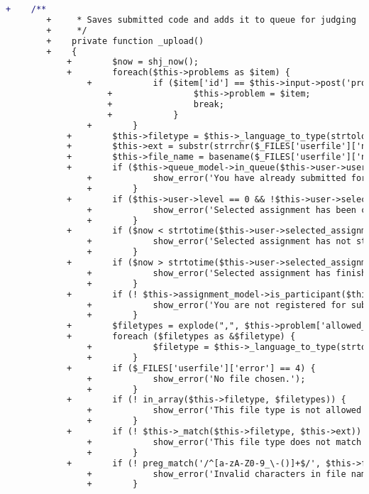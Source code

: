\begin{lstlisting}[language=diff, caption=Perubahan pada kode Submit.php]
		+    /**
		+     * Saves submitted code and adds it to queue for judging
		+     */
		+    private function _upload()
		+    {
			+        $now = shj_now();
			+        foreach($this->problems as $item) {
				+            if ($item['id'] == $this->input->post('problem')) {
					+                $this->problem = $item;
					+                break;
					+            }
				+        }
			+        $this->filetype = $this->_language_to_type(strtolower(trim($this->input->post('language'))));
			+        $this->ext = substr(strrchr($_FILES['userfile']['name'], '.'), 1); // uploaded file extension
			+        $this->file_name = basename($_FILES['userfile']['name'], ".{$this->ext}"); // uploaded file name without extension
			+        if ($this->queue_model->in_queue($this->user->username, $this->user->selected_assignment['id'], $this->problem['id'])) {
				+            show_error('You have already submitted for this problem. Your last submission is still in queue.');
				+        }
			+        if ($this->user->level == 0 && !$this->user->selected_assignment['open']) {
				+            show_error('Selected assignment has been closed.');
				+        }
			+        if ($now < strtotime($this->user->selected_assignment['start_time'])) {
				+            show_error('Selected assignment has not started.');
				+        }
			+        if ($now > strtotime($this->user->selected_assignment['finish_time']) + $this->user->selected_assignment['extra_time']) {
				+            show_error('Selected assignment has finished.');
				+        }
			+        if (! $this->assignment_model->is_participant($this->user->selected_assignment['participants'], $this->user->username)) {
				+            show_error('You are not registered for submitting.');
				+        }
			+        $filetypes = explode(",", $this->problem['allowed_languages']);
			+        foreach ($filetypes as &$filetype) {
				+            $filetype = $this->_language_to_type(strtolower(trim($filetype)));
				+        }
			+        if ($_FILES['userfile']['error'] == 4) {
				+            show_error('No file chosen.');
				+        }
			+        if (! in_array($this->filetype, $filetypes)) {
				+            show_error('This file type is not allowed for this problem.');
				+        }
			+        if (! $this->_match($this->filetype, $this->ext)) {
				+            show_error('This file type does not match your selected language.');
				+        }
			+        if (! preg_match('/^[a-zA-Z0-9_\-()]+$/', $this->file_name)) {
				+            show_error('Invalid characters in file name.');
				+        }
			

\end{lstlisting}
